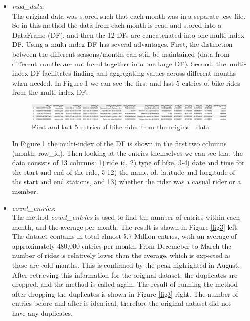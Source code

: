 \documentclass[12pt]{article}
\begin{document}
\begin{itemize}
	\item \textit{read\_data}:\\
	The original data was stored such that each month was in a separate .csv file. So in this method the data from each month is read and stored into a DataFrame (DF), and then the 12 DFs are concatenated into one multi-index DF. Using a multi-index DF has several advantages. First, the distinction between the different seasons/months can still be maintained (data from different months are not fused together into one large DF). Second, the multi-index DF facilitates finding and aggregating values across different months when needed. In Figure \ref{fig1} we can see the first and last 5 entries of bike rides from the multi-index DF:

	\begin{figure}[h]
	\hspace{-1.1cm}
	\includegraphics[scale=0.45]{img1.png}
	\caption{First and last 5 entries of bike rides from the original\_data}
	\label{fig1}
	\end{figure}
	\pagebreak
	
	In Figure \ref{fig1} the multi-index of the DF is shown in the first two columns (month, row\_id). Then looking at the entries themselves we can see that the data consists of 13 columns: 1) ride id, 2) type of bike, 3-4) date and time for the start and end of the ride, 5-12) the name, id, latitude and longitude of the start and end stations, and 13) whether the rider was a casual rider or a member. 
	
	\item \textit{count\_entries}:\\
	The method \textit{count\_entries} is used to find the number of entries within each month, and the average per month. The result is shown in Figure \ref{fig3} left. The dataset contains in total almost 5.7 Million entries, with an average of approximately 480,000 entries per month. From Decemeber to March the number of rides is relatively lower than the average, which is expected as these are cold months. This is confirmed by the peak highlighted in August. After retrieving this information for the original dataset, the duplicates are dropped, and the method is called again. The result of running the method after dropping the duplicates is shown in Figure \ref{fig3} right. The number of entries before and after is identical, therefore the original dataset did not have any duplicates.\\ 
	

\end{itemize}
\end{document}
